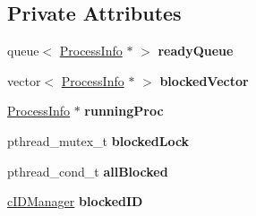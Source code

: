 \subsection*{\-Private \-Attributes}
\begin{DoxyCompactItemize}
\item 
\hypertarget{classcFCFS_afebe08e2ae6dc564b5aad24e3b30f842}{queue$<$ \hyperlink{structProcessInfo}{\-Process\-Info} $\ast$ $>$ {\bfseries ready\-Queue}}\label{d6/dc3/classcFCFS_afebe08e2ae6dc564b5aad24e3b30f842}

\item 
\hypertarget{classcFCFS_a1353ba13053c744e539b72ae06f0bf31}{vector$<$ \hyperlink{structProcessInfo}{\-Process\-Info} $\ast$ $>$ {\bfseries blocked\-Vector}}\label{d6/dc3/classcFCFS_a1353ba13053c744e539b72ae06f0bf31}

\item 
\hypertarget{classcFCFS_a6ba522300c166895a7db48d7ab918b4e}{\hyperlink{structProcessInfo}{\-Process\-Info} $\ast$ {\bfseries running\-Proc}}\label{d6/dc3/classcFCFS_a6ba522300c166895a7db48d7ab918b4e}

\item 
\hypertarget{classcFCFS_ac5c0a078ed1168066d8f82c03c65d4ed}{pthread\-\_\-mutex\-\_\-t {\bfseries blocked\-Lock}}\label{d6/dc3/classcFCFS_ac5c0a078ed1168066d8f82c03c65d4ed}

\item 
\hypertarget{classcFCFS_aeb0c28f6c914a52ef0c40acf864bdb18}{pthread\-\_\-cond\-\_\-t {\bfseries all\-Blocked}}\label{d6/dc3/classcFCFS_aeb0c28f6c914a52ef0c40acf864bdb18}

\item 
\hypertarget{classcFCFS_a1cc5fa525a8adb5826dd1dedebd2ff6b}{\hyperlink{classcIDManager}{c\-I\-D\-Manager} {\bfseries blocked\-I\-D}}\label{d6/dc3/classcFCFS_a1cc5fa525a8adb5826dd1dedebd2ff6b}

\end{DoxyCompactItemize}


